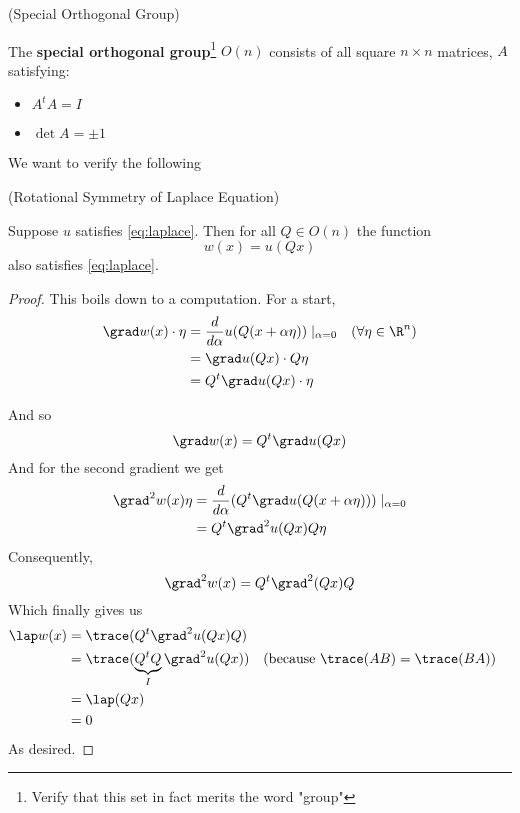 \documentclass{bkcnotes}
\begin{document}
\begin{ndefn}(Special Orthogonal Group)
  
  The \textbf{special orthogonal group}\footnote{Verify that this set
    in fact merits the word "group"} $O(n)$ consists of all square $n
  \times n$ matrices, $A$ satisfying:
  \begin{itemize}
  \item $A^tA = I$
  \item $\det A = \pm 1$
  \end{itemize}
\end{ndefn}
We want to verify the following
\begin{nprop}(Rotational Symmetry of Laplace Equation)

  Suppose $u$ satisfies \eqref{eq:laplace}. Then for all $Q \in O(n)$
  the function
  \begin{equation}
    \label{eq:w}
    w(x) = u(Qx)
  \end{equation}
  also satisfies \eqref{eq:laplace}.
\end{nprop}
\begin{proof}
  This boils down to a computation. For a start,
  \begin{equation}
    \label{eq:w-grad-comp}
    \begin{aligned}
      \grad w(x) \cdot \eta &= \frac{d}{d\alpha}
      u(Q(x+\alpha\eta))\mid_{\alpha=0}
      && (\forall\eta \in \R^n) \\
      &= \grad u(Qx)\cdot Q\eta \\
      &= Q^t\grad u(Qx)\cdot \eta
    \end{aligned}
  \end{equation}

  And so
  \begin{equation}
    \label{eq:grad-w}
    \grad w(x) = Q^t\grad u(Qx)
  \end{equation}
  And for the second gradient we get
  \begin{equation}
    \label{eq:w-snd-grad-comp}
    \begin{aligned}
      \grad^2w(x)\eta &= \frac{d}{d\alpha}(Q^t\grad
      u(Q(x+\alpha\eta)))\mid_{\alpha=0} \\
      &= Q^t\grad^2u(Qx)Q\eta
    \end{aligned}
  \end{equation}
  Consequently,
  \begin{equation}
    \label{eq:w-snd-grad}
    \grad^2w(x) = Q^t\grad^2(Qx)Q
  \end{equation}
  Which finally gives us
  \begin{equation}
    \label{eq:lap-w}
    \begin{aligned}
      \lap w(x) &= \trace (Q^t\grad^2u(Qx)Q) \\
      &= \trace (\underbrace{Q^tQ}_{I}\grad^2u(Qx))
      && (\text{because } \trace (AB) = \trace(BA)) \\
      &= \lap(Qx) \\
      &= 0
    \end{aligned}
  \end{equation}
  As desired.
\end{proof}
\end{document}
